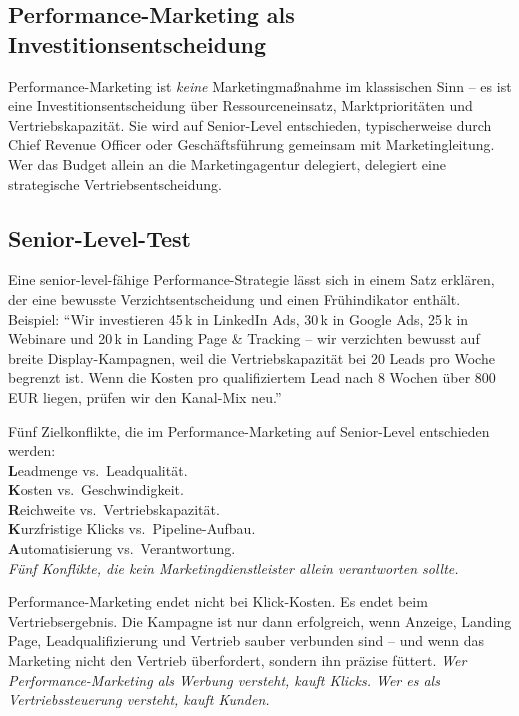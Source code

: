 \documentclass[11pt,a4paper,oneside]{article}
\newcommand{\caveatfontfallback}{\itshape}
\newcommand\caveatfont{\caveatfontfallback}%
\newcommand{\akzent}[1]{{\caveatfont\color{lpAmber}#1}}
\begin{document}
\subsection{Performance-Marketing als Investitionsentscheidung}

Performance-Marketing ist \emph{keine} Marketingmaßnahme im klassischen Sinn -- es ist eine Investitionsentscheidung über Ressourceneinsatz, Marktprioritäten und Vertriebskapazität. Sie wird auf Senior-Level entschieden, typischerweise durch Chief Revenue Officer oder Geschäftsführung gemeinsam mit Marketingleitung. Wer das Budget allein an die Marketingagentur delegiert, delegiert eine strategische Vertriebsentscheidung.

\subsection{Senior-Level-Test}

Eine senior-level-fähige Performance-Strategie lässt sich in einem Satz erklären, der eine bewusste Verzichtsentscheidung und einen Frühindikator enthält. Beispiel: ``Wir investieren 45\,k in LinkedIn Ads, 30\,k in Google Ads, 25\,k in Webinare und 20\,k in Landing Page \& Tracking -- wir verzichten bewusst auf breite Display-Kampagnen, weil die Vertriebskapazität bei 20 Leads pro Woche begrenzt ist. Wenn die Kosten pro qualifiziertem Lead nach 8 Wochen über 800\,EUR liegen, prüfen wir den Kanal-Mix neu.''

\begin{eselsbox}[Eselsbrücke: \akzent{L-K-R-K-A}]
Fünf Zielkonflikte, die im Performance-Marketing auf Senior-Level entschieden werden:\\[2pt]
\textbf{L}eadmenge vs.\ Leadqualität.\\
\textbf{K}osten vs.\ Geschwindigkeit.\\
\textbf{R}eichweite vs.\ Vertriebskapazität.\\
\textbf{K}urzfristige Klicks vs.\ Pipeline-Aufbau.\\
\textbf{A}utomatisierung vs.\ Verantwortung.\\[2pt]
\emph{Fünf Konflikte, die kein Marketingdienstleister allein verantworten sollte.}
\end{eselsbox}

\begin{merkbox}
Performance-Marketing endet nicht bei Klick-Kosten. Es endet beim Vertriebsergebnis. Die Kampagne ist nur dann erfolgreich, wenn Anzeige, Landing Page, Leadqualifizierung und Vertrieb sauber verbunden sind -- und wenn das Marketing nicht den Vertrieb überfordert, sondern ihn präzise füttert. \emph{Wer Performance-Marketing als Werbung versteht, kauft Klicks. Wer es als Vertriebssteuerung versteht, kauft Kunden.}
\end{merkbox}
\end{document}
